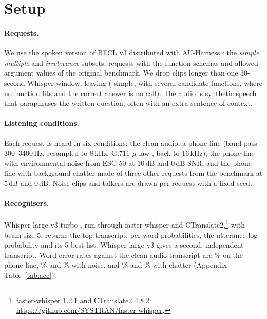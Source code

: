 \documentclass[11pt]{article}
\begin{document}
\section{Setup}

\paragraph{Requests.} We use the spoken version of BFCL v3 distributed with AU-Harness \citep{nguyen2025auharness,servicenow2025bfclv3audio}: the \emph{simple}, \emph{multiple} and \emph{irrelevance} subsets, \NItemsAll{} requests with the function schemas and allowed argument values of the original benchmark. We drop clips longer than one 30-second Whisper window, leaving \NItems{} (\NSimple{} simple, \NMultiple{} with several candidate functions, \NIrrelevance{} where no function fits and the correct answer is no call). The audio is synthetic speech that paraphrases the written question, often with an extra sentence of context.

\paragraph{Listening conditions.} Each request is heard in six conditions: the clean audio; a phone line (band-pass 300--3400\,Hz, resampled to 8\,kHz, G.711 $\mu$-law \citep{itu1988g711}, back to 16\,kHz); the phone line with environmental noise from ESC-50 \citep{piczak2015esc} at 10\,dB and 0\,dB SNR; and the phone line with background chatter made of three other requests from the benchmark at 5\,dB and 0\,dB. Noise clips and talkers are drawn per request with a fixed seed.

\paragraph{Recognisers.} Whisper large-v3-turbo \citep{radford2023whisper}, run through faster-whisper and CTranslate2,\footnote{faster-whisper 1.2.1 and CTranslate2 4.8.2: \url{https://github.com/SYSTRAN/faster-whisper}.} with beam size 5, returns the top transcript, per-word probabilities, the utterance log-probability and its 5-best list. Whisper large-v3 gives a second, independent transcript. Word error rates against the clean-audio transcript are \WerPhone\% on the phone line, \WerNoiseTen\% and \WerNoiseZero\% with noise, and \WerChatterFive\% and \WerChatterZero\% with chatter (Appendix Table~\ref{tab:acc}).
\end{document}
